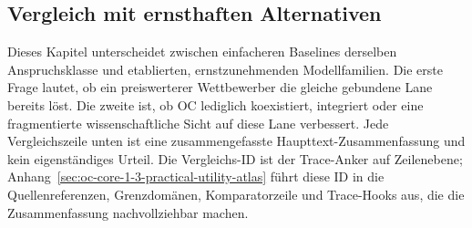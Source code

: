 \subsection{Vergleich mit ernsthaften Alternativen}
Dieses Kapitel unterscheidet zwischen einfacheren Baselines derselben Anspruchsklasse und etablierten, ernstzunehmenden Modellfamilien. Die erste Frage lautet, ob ein preiswerterer Wettbewerber die gleiche gebundene Lane bereits löst. Die zweite ist, ob OC lediglich koexistiert, integriert oder eine fragmentierte wissenschaftliche Sicht auf diese Lane verbessert.
Jede Vergleichszeile unten ist eine zusammengefasste Haupttext-Zusammenfassung und kein eigenständiges Urteil. Die Vergleichs-ID ist der Trace-Anker auf Zeilenebene; Anhang~\ref{sec:oc-core-1-3-practical-utility-atlas} führt diese ID in die Quellenreferenzen, Grenzdomänen, Komparatorzeile und Trace-Hooks aus, die die Zusammenfassung nachvollziehbar machen.

